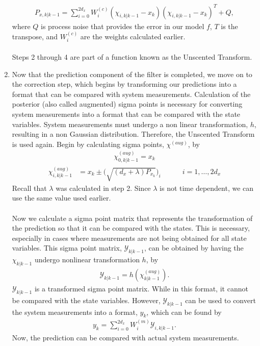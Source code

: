 \begin{enumerate}
        \begin{align*}
        P_{x, k | k-1} = \sum^{2d_x}_{i = 0} W_i^{(c)} (\chi_{i, k | k - 1} -   x_{k} )(\chi_{i, k | k - 1} - x_{k} )^T + Q,
        \end{align*} 
        where $Q$ is process noise that provides the error in our model $f$, $T$ is the transpose, and $W_i^{(c)}$ are the weights calculated earlier. \\ \\
        Steps 2 through 4 are part of a function known as the Unscented Transform.
        
        
                \item Now that the prediction component of the filter is completed, we move on to the correction step, which begins by transforming our predictions into a format that can be compared with system measurements. Calculation of the posterior (also called augmented) sigma points is necessary for converting system measurements into a format that can be compared with the state variables. System measurements must undergo a non linear transformation, $h$, resulting in a non Gaussian distribution. Therefore, the Unscented Transform is used again. Begin by calculating sigma points, $\chi^{(aug)}$, by
      \begin{align*}
        \chi^{(aug)}_{0, k|k-1} =  x_{k}
        \end{align*}
         \begin{align*}
        \chi^{(aug)}_{ i,k |k-1} &= x_k  \pm \bigg(\sqrt{(d_{x}+\lambda)P_{x_k}} \bigg)_{i} \quad \quad \quad  i=1,\dots,2d_{x}
        \end{align*}
        Recall that $\lambda$ was calculated in step 2. Since $\lambda$ is not time dependent, we can use the same value used earlier. \\ \\
        Now we calculate a sigma point matrix that represents the transformation of the prediction so that it can be compared with the states. This is necessary, especially in cases where measurements are not being obtained for all state variables. This sigma point matrix, $\mathcal{Y}_{k|k-1}$, can be obtained by having the $\chi_{k|k-1}$ undergo nonlinear transformation $h$, by
         \begin{align*}
       \mathcal{Y}_{k|k-1} = h(\chi^{(aug)}_{k|k-1}).
       \end{align*}
       $\mathcal{Y}_{k|k-1} $ is a transformed sigma point matrix. While in this format, it cannot be compared with the state variables. However, $\mathcal{Y}_{k|k-1}$ can be used to convert the system measurements into a format, $y_{k} $, which can be found by 
       \begin{align*}
       y_{k} = \sum^{2d_x}_{i = 0} W_i^{(m)}  \mathcal{Y}_{i, k | k - 1}.
       \end{align*}
       Now, the prediction can be compared with actual system measurements.
       

\end{enumerate}
